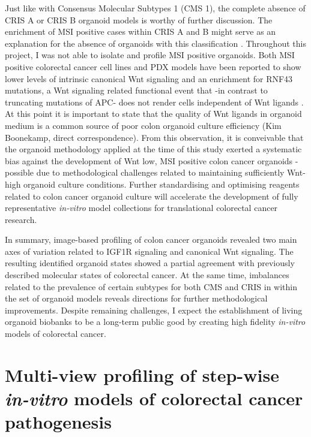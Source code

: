 \begin{flushleft}
Just like with Consensus Molecular Subtypes 1 (CMS 1), the complete absence of CRIS A or CRIS B organoid models is worthy of further discussion. The enrichment of MSI positive cases within CRIS A and B might serve as an explanation for the absence of organoids with this classification \citep{isellaSelectiveAnalysisCancercell2017a}. Throughout this project, I was not able to isolate and profile MSI positive organoids. Both MSI positive colorectal cancer cell lines \citep{imkellerMetabolicBalanceColorectal2022} and PDX models \citep{isellaSelectiveAnalysisCancercell2017a} have been reported to show lower levels of intrinsic canonical Wnt signaling and an enrichment for RNF43 mutations, a Wnt signaling related functional event that -in contrast to truncating mutations of APC- does not render cells independent of Wnt ligands \citep{vandeweteringProspectiveDerivationLiving2015}. At this point it is important to state that the quality of Wnt ligands in organoid medium is a common source of poor colon organoid culture efficiency (Kim Boonekamp, direct correspondence). From this observation, it is conveivable that the organoid methodology applied at the time of this study exerted a systematic bias against the development of Wnt low, MSI positive colon cancer organoids - possible due to methodological challenges related to maintaining sufficiently Wnt-high organoid culture conditions. Further standardising and optimising reagents related to colon cancer organoid culture will accelerate the development of fully representative \textit{in-vitro} model collections for translational colorectal cancer research. 

In summary, image-based profiling of colon cancer organoids revealed two main axes of variation related to IGF1R signaling and canonical Wnt signaling. The resulting identified organoid states showed a partial agreement with previously described molecular states of colorectal cancer. At the same time, imbalances related to the prevalence of certain subtypes for both CMS and CRIS in within the set of organoid models reveals directions for further methodological improvements. Despite remaining challenges, I expect the establishment of living organoid biobanks to be a long-term public good by creating high fidelity \textit{in-vitro} models of colorectal cancer. 

\section{Multi-view profiling of step-wise \textit{in-vitro} models of colorectal cancer pathogenesis}


\end{flushleft}
